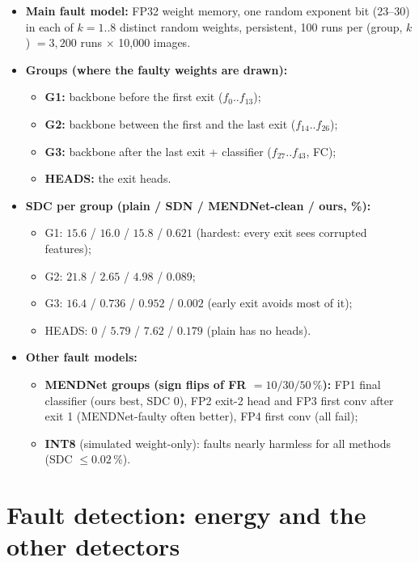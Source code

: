 \documentclass[10pt,a4paper]{article}
\begin{document}
\begin{itemize}
  \item \textbf{Main fault model:} FP32 weight memory, one random exponent bit (23--30) in each of $k=1..8$
        distinct random weights, persistent, 100 runs per (group, $k$) $=3{,}200$ runs $\times$ 10{,}000 images.
  \item \textbf{Groups (where the faulty weights are drawn):}
  \begin{itemize}
    \item \textbf{G1:} backbone before the first exit ($f_0..f_{13}$);
    \item \textbf{G2:} backbone between the first and the last exit ($f_{14}..f_{26}$);
    \item \textbf{G3:} backbone after the last exit + classifier ($f_{27}..f_{43}$, FC);
    \item \textbf{HEADS:} the exit heads.
  \end{itemize}
  \item \textbf{SDC per group (plain / SDN / MENDNet-clean / ours, \%):}
  \begin{itemize}
    \item G1: $15.6$ / $16.0$ / $15.8$ / $\mathbf{0.621}$ (hardest: every exit sees corrupted features);
    \item G2: $21.8$ / $2.65$ / $4.98$ / $\mathbf{0.089}$;
    \item G3: $16.4$ / $0.736$ / $0.952$ / $\mathbf{0.002}$ (early exit avoids most of it);
    \item HEADS: $0$ / $5.79$ / $7.62$ / $\mathbf{0.179}$ (plain has no heads).
  \end{itemize}
  \item \textbf{Other fault models:}
  \begin{itemize}
    \item \textbf{MENDNet groups (sign flips of FR $=10/30/50\,\%$):} FP1 final classifier (ours best, SDC 0),
          FP2 exit-2 head and FP3 first conv after exit 1 (MENDNet-faulty often better), FP4 first conv (all fail);
    \item \textbf{INT8} (simulated weight-only): faults nearly harmless for all methods (SDC $\le0.02\,\%$).
  \end{itemize}
\end{itemize}

\section{Fault detection: energy and the other detectors}
\end{document}
